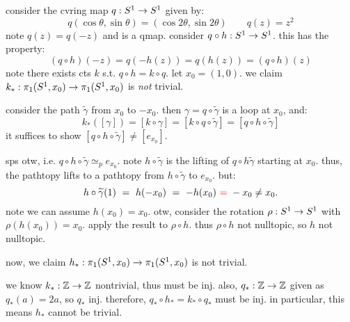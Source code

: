 \begin{pf}[source=Primary Source Material]
    consider the cvring map $q:S^{1}\rightarrow S^{1}$ given by:
    \begin{equation*}
        q(\cos\theta,\sin\theta) = (\cos2\theta,\sin2\theta) \qquad
        q(z)=z^{2}
    \end{equation*}
    note $q(z)=q(-z)$ and is a qmap.
    consider $q\circ h:S^{1}\rightarrow S^{1}$. this has the property:
    \begin{equation*}
        (q\circ h)(-z)=q(-h(z))=q(h(z))=(q\circ h)(z)
    \end{equation*}
    note there exists cts $k$ s.t. $q\circ h=k\circ q$.
    let $x_{0}=(1,0)$. we claim $k_{*}:\pi_{1}(S^{1},x_{0})\rightarrow\pi_{1}(S^{1},x_{0})$ is \textit{not}
    trivial.
    \begin{block}
        consider the path $\tilde{\gamma}$ from $x_{0}$ to $-x_{0}$.
        then $\gamma=q\circ\tilde{\gamma}$ is a loop at $x_{0}$, and:
        \begin{equation*}
            k_{*}([\gamma])=[k\circ\gamma]=[k\circ q\circ\tilde{\gamma}]
            =[q\circ h\circ\tilde{\gamma}]
        \end{equation*}
        it suffices to show $[q\circ h\circ\tilde{\gamma}]\neq[e_{x_{0}}]$.
        
        sps otw, i.e. $q\circ h\circ\tilde{\gamma}\simeq_{p}e_{x_{0}}$.
        note $h\circ\tilde{\gamma}$ is the lifting of $q\circ h\tilde{\gamma}$ starting at $x_{0}$.
        thus, the pathtopy lifts to a pathtopy from $h\circ\tilde{\gamma}$ to $e_{x_{0}}$. but:
        \begin{equation*}
            h\circ\tilde{\gamma}(1)\ = \ h(-x_{0})\ = \ -h(x_{0})
            \ \textcolor{red}{=}\ -x_{0}\neq x_{0}.
        \end{equation*}
        note we can assume $h(x_{0})=x_{0}$.
        otw, consider the rotation $\rho:S^{1}\rightarrow S^{1}$ with $\rho(h(x_{0}))=x_{0}$.
        apply the result to $\rho\circ h$.
        thus $\rho\circ h$ not nulltopic, so $h$ not nulltopic.
    \end{block}
    now, we claim $h_{*}:\pi_{1}(S^{1},x_{0})\rightarrow\pi_{1}(S^{1},x_{0})$ is not trivial.
    \begin{block}
        we know $k_{*}:\mathbb{Z}\rightarrow\mathbb{Z}$ nontrivial, thus must be inj.
        also, $q_{*}:\mathbb{Z}\rightarrow\mathbb{Z}$ given as $q_{*}(a)=2a$, so $q_{*}$ inj.
        therefore, $q_{*}\circ h_{*}=k_{*}\circ q_{*}$ must be inj.
        in particular, this means $h_{*}$ cannot be trivial.
    \end{block}
\end{pf}

